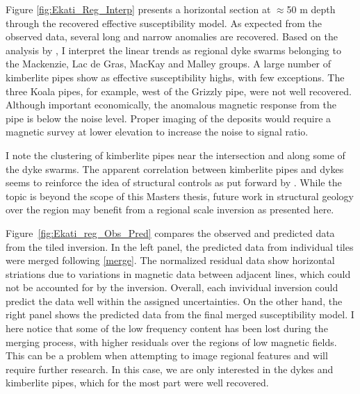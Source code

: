 Figure \ref{fig:Ekati_Reg_Interp} presents a horizontal section at $\approx$50 m depth through the recovered effective susceptibility model.
As expected from the observed data, several long and narrow anomalies are recovered.
Based on the analysis by \cite{Buchan09}, I interpret the linear trends as regional dyke swarms belonging to the Mackenzie, Lac de Gras, MacKay and Malley groups.
A large number of kimberlite pipes show as effective susceptibility highs, with few exceptions.
The three Koala pipes, for example, west of the Grizzly pipe, were not well recovered.
Although important economically, the anomalous magnetic response from the pipe is below the noise level.
Proper imaging of the deposits would require a magnetic survey at lower elevation to increase the noise to signal ratio.

I note the clustering of kimberlite pipes near the intersection and along some of the dyke swarms.
The apparent correlation between kimberlite pipes and dykes seems to reinforce the idea of structural controls as put forward by \cite{Wright1999}.
While the topic is beyond the scope of this Masters thesis, future work in structural geology over the region may benefit from a regional scale inversion as presented here.

Figure~\ref{fig:Ekati_reg_Obs_Pred} compares the observed and predicted data from the tiled inversion. In the left panel, the predicted data from individual tiles were merged following \ref{merge}. The normalized residual data show horizontal striations due to variations in magnetic data between adjacent lines, which could not be accounted for by the inversion. 
Overall, each invividual inversion could predict the data well within the assigned uncertainties.
On the other hand, the right panel shows the predicted data from the final merged susceptibility model.
I here notice that some of the low frequency content has been lost during the merging process, with higher residuals over the regions of low magnetic fields.
This can be a problem when attempting to image regional features and will require further research.
In this case, we are only interested in the dykes and kimberlite pipes, which for the most part were well recovered.


